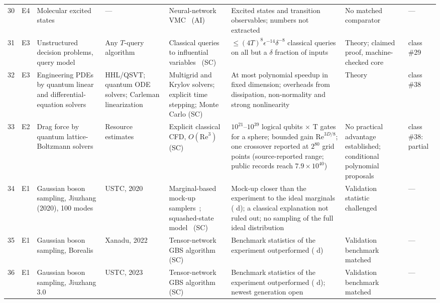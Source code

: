 \documentclass[10pt,a4paper]{article}
\newcommand{\mtP}{\textcolor{qcF}{\textsf{partial}}}
\begin{document}
{\begin{longtable}{@{}r L{0.7cm} L{2.25cm} L{1.9cm} L{3.1cm} L{3.4cm} L{1.85cm} L{1.3cm}@{}}
30 & E4 & Molecular excited states & --- & Neural-network VMC~\cite{pfau2024,schatzle2026} (AI) & Excited states and transition observables; numbers not extracted & No matched comparator & ---\\
31 & E3 & Unstructured decision problems, query model & Any $T$-query algorithm & Classical queries to influential variables~\cite{aa2014,turturean2026} (SC) & $\le(4T)^8\epsilon^{-14}\delta^{-8}$ classical queries on all but a $\delta$ fraction of inputs & Theory; claimed proof, machine-checked core & class \#29\\
32 & E3 & Engineering PDEs by quantum linear and differential-equation solvers & HHL/QSVT; quantum ODE solvers; Carleman linearization & Multigrid and Krylov solvers; explicit time stepping; Monte Carlo (SC)~\cite{montanaro2016,linden2022,an2025,lewis2024} & At most polynomial speedup in fixed dimension; overheads from dissipation, non-normality and strong nonlinearity & Theory & class \#38\\
33 & E2 & Drag force by quantum lattice-Boltzmann solvers & Resource estimates~\cite{penuel2025,jennings2025,zhuang2025} & Explicit classical CFD, $O(\mathrm{Re}^3)$ (SC) & $10^{21}$--$10^{39}$ logical qubits $\times$ T gates for a sphere; bounded gain $\mathrm{Re}^{3D/8}$; one crossover reported at $2^{80}$ grid points (source-reported range; public records reach $7.9\times10^{40}$) & No practical advantage established; conditional polynomial proposals & class \#38: \mtP\\
34 & E1 & Gaussian boson sampling, Jiuzhang (2020), 100 modes & USTC, 2020~\cite{zhong2020} & Marginal-based mock-up samplers~\cite{villalonga2021}; squashed-state model~\cite{martinez2023} (SC) & Mock-up closer than the experiment to the ideal marginals ( d); a classical explanation not ruled out; no sampling of the full ideal distribution & Validation statistic challenged & ---\\
35 & E1 & Gaussian boson sampling, Borealis & Xanadu, 2022~\cite{madsen2022} & Tensor-network GBS algorithm~\cite{oh2024} (SC) & Benchmark statistics of the experiment outperformed ( d) & Validation benchmark matched & ---\\
36 & E1 & Gaussian boson sampling, Jiuzhang 3.0 & USTC, 2023~\cite{deng2023} & Tensor-network GBS algorithm~\cite{oh2024} (SC) & Benchmark statistics of the experiment outperformed ( d); newest generation open~\cite{hangleiter2026} & Validation benchmark matched & ---\\
\end{longtable}
}
\end{document}
